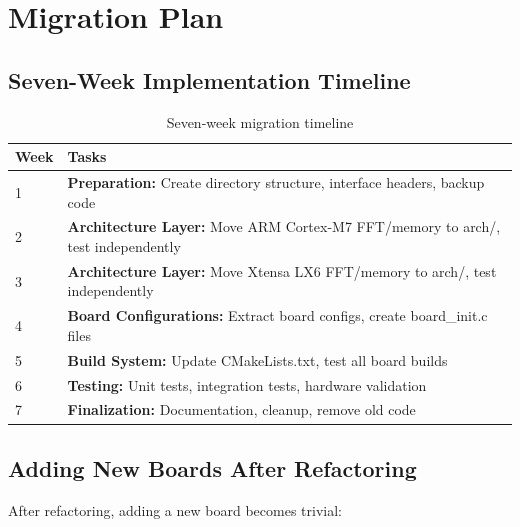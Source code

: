 \documentclass[11pt,a4paper]{article}
\begin{document}
\section{Migration Plan}

\subsection{Seven-Week Implementation Timeline}

\begin{table}[h]
\centering
\begin{tabularx}{\textwidth}{|l|X|}
\hline
\textbf{Week} & \textbf{Tasks} \\
\hline
1 & \textbf{Preparation:} Create directory structure, interface headers, backup code \\
\hline
2 & \textbf{Architecture Layer:} Move ARM Cortex-M7 FFT/memory to arch/, test independently \\
\hline
3 & \textbf{Architecture Layer:} Move Xtensa LX6 FFT/memory to arch/, test independently \\
\hline
4 & \textbf{Board Configurations:} Extract board configs, create board\_init.c files \\
\hline
5 & \textbf{Build System:} Update CMakeLists.txt, test all board builds \\
\hline
6 & \textbf{Testing:} Unit tests, integration tests, hardware validation \\
\hline
7 & \textbf{Finalization:} Documentation, cleanup, remove old code \\
\hline
\end{tabularx}
\caption{Seven-week migration timeline}
\end{table}

\subsection{Adding New Boards After Refactoring}

After refactoring, adding a new board becomes trivial:
\end{document}
